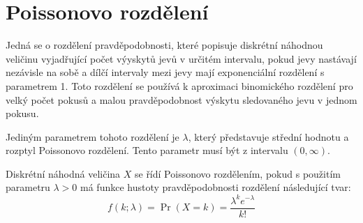 \documentclass[12pt, a4paper]{article}
\let\oldsection\section
\renewcommand\section{\clearpage\oldsection}
\begin{document}
\section{Poissonovo rozdělení}
    Jedná se o rozdělení pravděpodobnosti, které popisuje diskrétní náhodnou veličinu vyjadřující počet výyskytů jevů v určitém intervalu, pokud jevy nastávají nezávisle na sobě a dílčí intervaly mezi jevy mají exponenciální rozdělení s parametrem 1.
Toto rozdělení se používá k aproximaci binomického rozdělení pro velký počet pokusů a malou pravděpodobnost výskytu sledovaného jevu v jednom pokusu.

    Jediným parametrem tohoto rozdělení je $\lambda$, který představuje střední hodnotu a rozptyl Poissonovo rozdělení. Tento parametr musí být z intervalu $(0, \infty)$.

     Diskrétní náhodná veličina $X$ se řídí Poissonovo rozdělením, pokud s použitím parametru $\lambda > 0$ má funkce hustoty pravděpodobnosti rozdělení následující tvar:
    \begin{displaymath}
       \!f(k; \lambda)= \Pr(X{=}k)= \frac{\lambda^k e^{-\lambda}}{k!}
    \end{displaymath}
\end{document}
